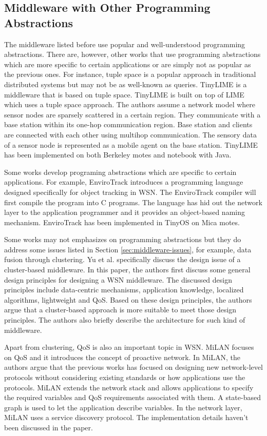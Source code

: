 \subsection{Middleware with Other Programming Abstractions}
The middleware listed before use popular and well-understood programming abstractions. There are, however, other works that use programming abstractions which are more specific to certain applications or are simply not as popular as the previous ones. For instance, tuple space is a popular approach in traditional distributed systems but may not be as well-known as queries. TinyLIME \cite{tinylime} is a middleware that is based on tuple space. TinyLIME is built on top of LIME which uses a tuple space approach. The authors assume a network model where sensor nodes are sparsely scattered in a certain region. They communicate with a base station within its one-hop communication region. Base station and clients are connected with each other using multihop communication. The sensory data of a sensor node is represented as a mobile agent on the base station. TinyLIME has been implemented on both Berkeley motes and notebook with Java.

Some works develop programing abstractions which are specific to certain applications. For example, EnviroTrack \cite{envirotrack} introduces a programming language designed specifically for object tracking in WSN. The EnviroTrack compiler will first compile the program into C programs. The language has hid out the network layer to the application programmer and it provides an object-based naming mechanism. EnviroTrack has been implemented in TinyOS on Mica motes.

Some works may not emphasizes on programming abstractions but they do address some issues listed in Section \ref{sec:middleware-issues}, for example, data fusion through clustering. Yu et al. \cite{clustermiddleware} specifically discuss the design issue of a cluster-based middleware. In this paper, the authors first discuss some general design principles for designing a WSN middleware. The discussed design principles include data-centric mechanisms, application knowledge, localized algorithms, lightweight and QoS. Based on these design principles, the authors argue that a cluster-based approach is more suitable to meet those design principles. The authors also briefly describe the architecture for such kind of middleware.

Apart from clustering, QoS is also an important topic in WSN. MiLAN \cite{milan} focuses on QoS and it introduces the concept of proactive network. In MiLAN, the authors argue that the previous works has focused on designing new network-level protocols without considering existing standards or how applications use the protocols. MiLAN extends the network stack and allows applications to specify the required variables and QoS requirements associated with them. A state-based graph is used to let the application describe variables. In the network layer, MiLAN uses a service discovery protocol. The implementation details haven't been discussed in the paper.

